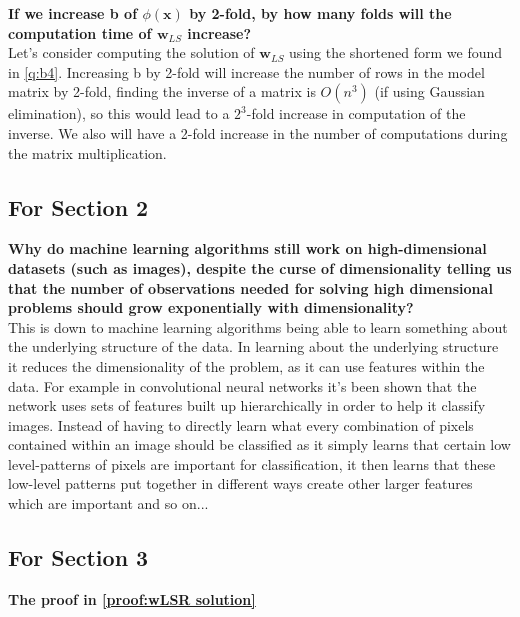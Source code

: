 \begin{appendices}
\begin{question}
    \textbf{If we increase b of $\phi(\bm{x})$ by 2-fold, by how many folds will the computation time of $\bm{w}_{LS}$ increase?} \\
    Let's consider computing the solution of $\bm{w}_{LS}$ using the shortened form we found in \cref{q:b4}.
    Increasing b by 2-fold will increase the number of rows in the model matrix by 2-fold, finding the inverse of a matrix is $O(n^{3})$ (if using Gaussian elimination), so this would lead to a $2^{3}$-fold increase in computation of the inverse. We also will have a 2-fold increase in the number of computations during the matrix multiplication.
\end{question}

\subsection{For Section 2}
\begin{question}
    \textbf{Why do machine learning algorithms still work on high-dimensional datasets (such as images), despite the curse of dimensionality telling us that the number of observations needed for solving high dimensional problems should grow exponentially with dimensionality?} \\
    This is down to machine learning algorithms being able to learn something about the underlying structure of the data. In learning about the underlying structure it reduces the dimensionality of the problem, as it can use features within the data. For example in convolutional neural networks it's been shown that the network uses sets of features built up hierarchically in order to help it classify images. Instead of having to directly learn what every combination of pixels contained within an image should be classified as it simply learns that certain low level-patterns of pixels are important for classification, it then learns that these low-level patterns put together in different ways create other larger features which are important and so on...
\end{question}


\subsection{For Section 3}
\begin{question}
    \textbf{The proof in \cref{proof:wLSR solution}}
\end{question}


\end{appendices}
